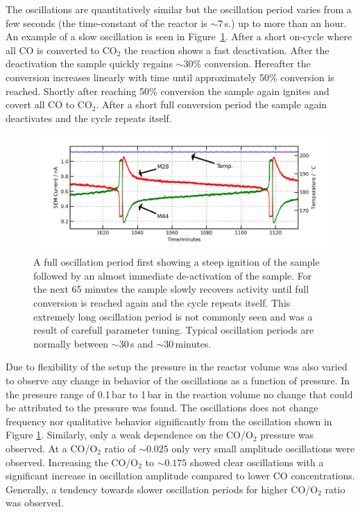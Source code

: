 \documentclass[8.5pt,twoside,twocolumn]{article}
\begin{document}
The oscillations are quantitatively similar but the oscillation period varies from a few seconds (the time-constant of the reactor is $\sim7\,$s.) up to more than an hour. An example of a slow oscillation is seen in Figure~\ref{fgr:full_oscillation}. After a short on-cycle where all CO is converted to CO$_2$ the reaction shows a fast deactivation. After the deactivation the sample quickly regains $\sim$30\% conversion. Hereafter the conversion increases linearly with time until approximately 50\% conversion is reached. Shortly after reaching 50\% conversion the sample again ignites and covert all CO to CO$_2$. After a short full conversion period the sample again deactivates and the cycle repeats itself.
\begin{figure}
  \centering
  \includegraphics[width=17cm]{single_full_oscillation.png}
  \caption{A full oscillation period first showing a steep ignition of the sample followed by an almost immediate de-activation of the sample. For the next 65 minutes the sample slowly recovers activity until full conversion is reached again and the cycle repeats itself. This extremely long oscillation period is not commonly seen and was a result of carefull parameter tuning. Typical oscillation periods are normally between $\sim$30\,s and $\sim$30\,minutes.}
  \label{fgr:full_oscillation}
\end{figure}

Due to flexibility of the setup the pressure in the reactor volume was also varied to observe any change in behavior of the oscillations as a function of pressure. In the pressure range of 0.1\,bar to 1\,bar in the reaction volume no change that could be attributed to the pressure was found. The oscillations does not change frequency nor qualitative behavior significantly from the oscillation shown in Figure \ref{fgr:full_oscillation}. Similarly, only a weak dependence on the CO/O$_2$ pressure was observed. At a CO/O$_2$ ratio of $\sim0.025$ only very small amplitude oscillations were observed. Increasing the CO/O$_2$ to $\sim0.175$ showed clear oscillations with a significant increase in oscillation amplitude compared to lower CO concentrations. Generally, a tendency towards slower oscillation periods for higher CO/O$_2$ ratio was observed.
\end{document}
